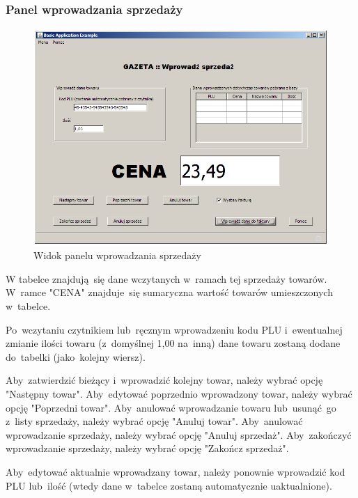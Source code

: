 \subsubsection{Panel wprowadzania sprzedaży}
\begin{figure}[h]
\includegraphics[height=1\textwidth,angle=90,keepaspectratio]{gfx/sprzedaz.png}
\caption{Widok panelu wprowadzania sprzedaży}
\end{figure}
W tabelce znajdują~się dane wczytanych w~ramach tej sprzedaży towarów. W~ramce "CENA" znajduje~się sumaryczna wartość towarów umieszczonych w~tabelce.

Po~wczytaniu czytnikiem lub~ręcznym wprowadzeniu kodu PLU i~ewentualnej zmianie ilości towaru (z~domyślnej 1,00 na~inną) dane towaru zostaną dodane do~tabelki (jako~kolejny wiersz).

Aby~zatwierdzić bieżący i~wprowadzić kolejny towar, należy wybrać opcję "Następny towar". Aby~edytować poprzednio wprowadzony towar, należy wybrać opcję "Poprzedni towar". Aby~anulować wprowadzanie towaru lub~usunąć~go z~listy sprzedaży, należy wybrać opcję "Anuluj towar". Aby~anulować wprowadzanie sprzedaży, należy wybrać opcję "Anuluj sprzedaż". Aby~zakończyć wprowadzanie sprzedaży, należy wybrać opcję "Zakończ sprzedaż".

Aby~edytować aktualnie wprowadzany towar, należy ponownie wprowadzić kod PLU lub~ilość (wtedy dane w~tabelce zostaną automatycznie uaktualnione).

